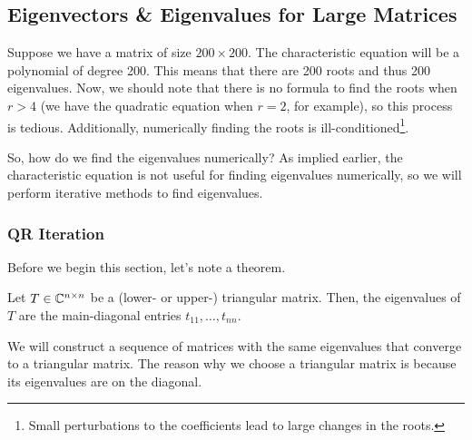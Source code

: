 \documentclass[letterpaper]{article}
\newcommand{\0}{\mathbf{0}}
\begin{document}
\subsection{Eigenvectors \& Eigenvalues for Large Matrices}
Suppose we have a matrix of size $200 \times 200$. The characteristic equation will be a polynomial of degree 200. This means that there are 200 roots and thus 200 eigenvalues. Now, we should note that there is no formula to find the roots when $r > 4$ (we have the quadratic equation when $r = 2$, for example), so this process is tedious. Additionally, numerically finding the roots is ill-conditioned\footnote{Small perturbations to the coefficients lead to large changes in the roots.}.

\bigskip 

So, how do we find the eigenvalues numerically? As implied earlier, the characteristic equation is not useful for finding eigenvalues numerically, so we will perform iterative methods to find eigenvalues. 

\subsubsection{QR Iteration}
Before we begin this section, let's note a theorem. 
\begin{theorem}{}{}
    Let $T \in \mathbb{C}^{n \times n}$ be a (lower- or upper-) triangular matrix. Then, the eigenvalues of $T$ are the main-diagonal entries $t_{11}, \hdots, t_{nn}$. 
\end{theorem}
We will construct a sequence of matrices with the same eigenvalues that converge to a triangular matrix. The reason why we choose a triangular matrix is because its eigenvalues are on the diagonal. 
\end{document}
